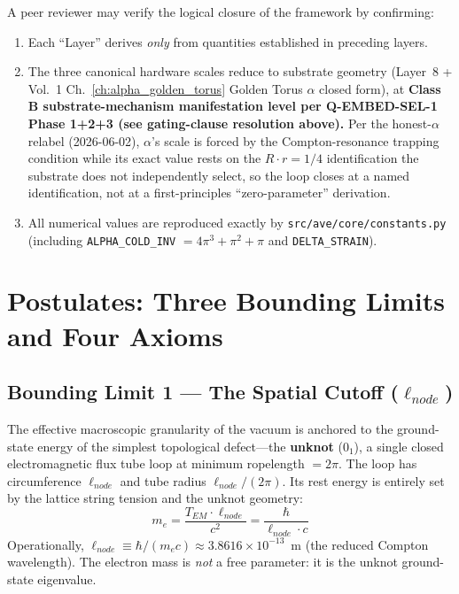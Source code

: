 A peer reviewer may verify the logical closure of the framework by confirming:
\begin{enumerate}
    \item Each ``Layer'' derives \textit{only} from quantities established in
          preceding layers.
    \item The three canonical hardware scales reduce to substrate geometry
          (Layer~8 + Vol.~1 Ch.~\ref{ch:alpha_golden_torus} Golden Torus
          $\alpha$ closed form), at \textbf{Class B substrate-mechanism
          manifestation level per Q-EMBED-SEL-1 Phase 1+2+3 (see gating-clause
          resolution above).} Per the honest-$\alpha$ relabel (2026-06-02),
          $\alpha$'s scale is forced by the Compton-resonance trapping condition
          while its exact value rests on the $R \cdot r = 1/4$ identification the
          substrate does not independently select, so the loop closes at a named
          identification, not at a first-principles ``zero-parameter''
          derivation.
    \item All numerical values are reproduced exactly by
          \texttt{src/ave/core/constants.py} (including
          \texttt{ALPHA\_COLD\_INV} $= 4\pi^3 + \pi^2 + \pi$ and
          \texttt{DELTA\_STRAIN}).
\end{enumerate}

\section{Postulates: Three Bounding Limits and Four Axioms}
\label{sec:postulates}

\subsection*{Bounding Limit 1 --- The Spatial Cutoff ($\ell_{node}$)}

The effective macroscopic granularity of the vacuum is anchored to the
ground-state energy of the simplest topological defect---the \textbf{unknot}
($0_1$), a single closed electromagnetic flux tube loop at minimum ropelength
$= 2\pi$. The loop has circumference $\ell_{node}$ and tube radius
$\ell_{node}/(2\pi)$. Its rest energy is entirely set by the lattice string
tension and the unknot geometry:
\begin{equation}
    m_e = \frac{T_{EM} \cdot \ell_{node}}{c^2}
    = \frac{\hbar}{\ell_{node} \cdot c}
    \label{eq:me_unknot}
\end{equation}
Operationally, $\ell_{node} \equiv \hbar / (m_e c) \approx 3.8616 \times
10^{-13}$~m (the reduced Compton wavelength). The electron mass is
\textit{not} a free parameter: it is the unknot ground-state eigenvalue.

